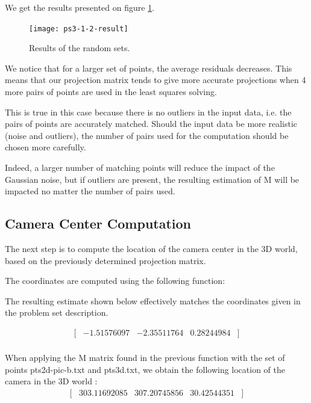 \documentclass[a4paper,11pt]{article}
\begin{document}
We get the results presented on figure \ref{ps3-1-2}.
 \begin{figure}[h!]
\begin{center}
	\texttt{[image: ps3-1-2-result]}
\end{center}
\caption{ Results of the random sets. }
\label{ps3-1-2}
\end{figure}

We notice that for a larger set of points, the average residuals decreases. 
This means that our projection matrix tends to give more accurate projections when 4 more pairs of points are used in the least squares solving.

This is true in this case because there is no outliers in the input data, i.e. the pairs of points are accurately matched. Should the input data be more realistic (noise and outliers), the number of pairs used for the computation should be
chosen more carefully.

Indeed, a larger number of matching points will reduce the impact of the Gaussian noise, but if outliers are present, the resulting estimation of M will be impacted no matter the number of pairs used.

\subsection{Camera Center Computation}

The next step is to compute the location of the camera center in the 3D world, based on the previously determined projection matrix.

The coordinates are computed using the following function:

\lstset{style=mystyle}


The resulting estimate shown below effectively matches the coordinates given in the problem set description.

$$
\begin{matrix}
[ &-1.51576097 & -2.35511764  & 0.28244984  & ]\\
\end{matrix}
$$

When applying the M matrix found in the previous function with the set of points pts2d-pic-b.txt and  pts3d.txt, we obtain the following location of the camera in the 3D world : 
$$
\begin{matrix}
[ &303.11692085 & 307.20745856  & 30.42544351  & ]\\
\end{matrix}
$$
\end{document}
